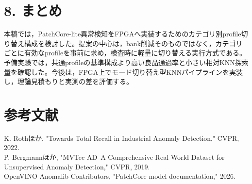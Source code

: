\documentclass[a4paper,twocolumn,10pt]{ltjsarticle}
\begin{document}
\section*{8. まとめ}
本稿では，PatchCore-lite異常検知をFPGAへ実装するためのカテゴリ別profile切り替え構成を検討した。提案の中心は，bank削減そのものではなく，カテゴリごとに有効なprofileを事前に求め，検査時に軽量に切り替える実行方式である。予備実験では，共通profileの基準構成より高い良品通過率と小さい相対KNN探索量を確認した。今後は，FPGA上でモード切り替え型KNNパイプラインを実装し，理論見積もりと実測の差を評価する。

\section*{参考文献}
\noindent [1] K. Rothほか, "Towards Total Recall in Industrial Anomaly Detection," CVPR, 2022.\\
\noindent [2] P. Bergmannほか, "MVTec AD--A Comprehensive Real-World Dataset for Unsupervised Anomaly Detection," CVPR, 2019.\\
\noindent [3] OpenVINO Anomalib Contributors, "PatchCore model documentation," 2026.\\
\end{document}
